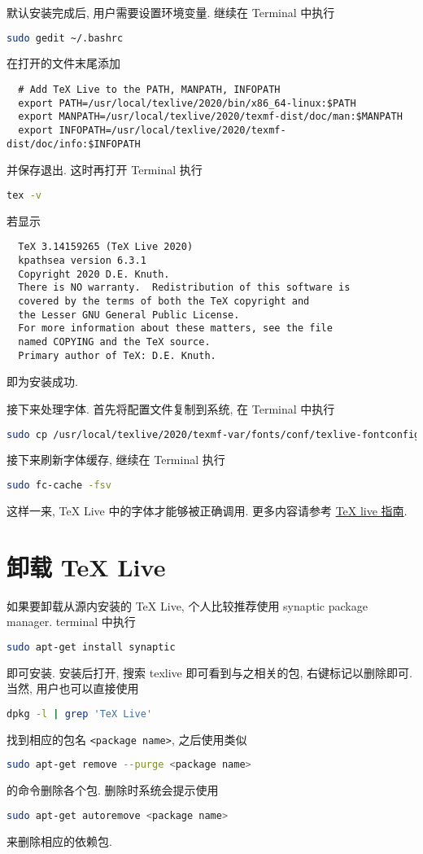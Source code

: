 默认安装完成后, 用户需要设置环境变量.
继续在 \textsf{Terminal} 中执行
\begin{lstlisting}[language = bash]
  sudo gedit ~/.bashrc
\end{lstlisting}
在打开的文件末尾添加
\begin{lstlisting}
  # Add TeX Live to the PATH, MANPATH, INFOPATH
  export PATH=/usr/local/texlive/2020/bin/x86_64-linux:$PATH
  export MANPATH=/usr/local/texlive/2020/texmf-dist/doc/man:$MANPATH
  export INFOPATH=/usr/local/texlive/2020/texmf-dist/doc/info:$INFOPATH
\end{lstlisting}
并保存退出.
这时再打开 \textsf{Terminal} 执行
\begin{lstlisting}[language=bash]
  tex -v
\end{lstlisting}
若显示
\begin{lstlisting}
  TeX 3.14159265 (TeX Live 2020)
  kpathsea version 6.3.1
  Copyright 2020 D.E. Knuth.
  There is NO warranty.  Redistribution of this software is
  covered by the terms of both the TeX copyright and
  the Lesser GNU General Public License.
  For more information about these matters, see the file
  named COPYING and the TeX source.
  Primary author of TeX: D.E. Knuth.
\end{lstlisting}
即为安装成功.

接下来处理字体.
首先将配置文件复制到系统,
在 \textsf{Terminal} 中执行
\begin{lstlisting}[language=bash]
  sudo cp /usr/local/texlive/2020/texmf-var/fonts/conf/texlive-fontconfig.conf /etc/fonts/conf.d/09-texlive.conf
\end{lstlisting}
接下来刷新字体缓存,
继续在 \textsf{Terminal} 执行
\begin{lstlisting}[language=bash]
  sudo fc-cache -fsv
\end{lstlisting}
这样一来, \TeX{} Live 中的字体才能够被正确调用.
更多内容请参考 \href{https://www.tug.org/texlive/doc/texlive-zh-cn/texlive-zh-cn.pdf}{\TeX{} live 指南}.

\section{卸载 \TeX{} Live}\label{sec:ubuntu:uninstall}

如果要卸载从源内安装的 \TeX{} Live, 个人比较推荐使用 synaptic package manager.
\textsf{terminal} 中执行
\begin{lstlisting}[language = bash]
  sudo apt-get install synaptic
\end{lstlisting}
即可安装.
安装后打开, 搜索 \textsf{texlive} 即可看到与之相关的包, 右键标记以删除即可.
当然, 用户也可以直接使用
\begin{lstlisting}[language = bash]
  dpkg -l | grep 'TeX Live'
\end{lstlisting}
找到相应的包名 \texttt{<package name>}, 之后使用类似
\begin{lstlisting}[language = bash]
  sudo apt-get remove --purge <package name>
\end{lstlisting}
的命令删除各个包.
删除时系统会提示使用
\begin{lstlisting}[language = bash]
  sudo apt-get autoremove <package name>
\end{lstlisting}
来删除相应的依赖包.

